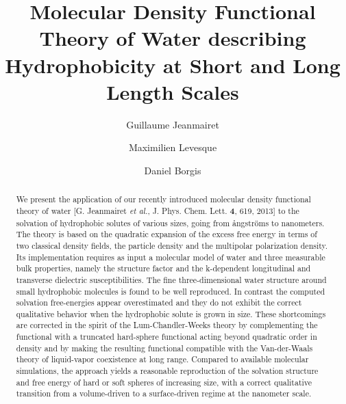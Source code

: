 \documentclass[aip,jcp,preprint]{revtex4-1}
\newcommand{\angstrom}{\r{a}ngstr\"{o}m}
\begin{document}
\title{Molecular Density Functional Theory of Water describing Hydrophobicity at Short and Long Length Scales}



\author{Guillaume Jeanmairet}

\author{Maximilien Levesque}

\author{Daniel Borgis}


\begin{abstract}
We present the application of our recently introduced  molecular density functional theory  of water [G. Jeanmairet {\em et al.}, J. Phys. Chem. Lett. {\bf 4}, 619, 2013] to the solvation of hydrophobic solutes of various sizes, going from \angstrom s to nanometers. The theory  is based on the quadratic expansion of the excess free energy in terms of two classical density fields, the particle density and the multipolar polarization density. Its implementation requires as input a molecular model of  water and  three measurable bulk properties, namely the structure factor and the k-dependent longitudinal and transverse dielectric susceptibilities. The fine  three-dimensional water structure around small hydrophobic molecules is found to be well reproduced. In contrast the  computed solvation free-energies appear overestimated and  they do not exhibit the correct qualitative behavior when the hydrophobic solute is grown in size.  These shortcomings are corrected in the spirit of the Lum-Chandler-Weeks theory by complementing the functional with a truncated hard-sphere functional acting beyond quadratic order in density and  by making the resulting functional compatible with the Van-der-Waals theory of liquid-vapor coexistence at long range. Compared to available molecular simulations, the approach yields a reasonable reproduction of the solvation structure and free energy of  hard or soft spheres of increasing size, with a correct qualitative transition from a volume-driven to a surface-driven regime at the nanometer scale.
\end{abstract}


\maketitle
\end{document}
